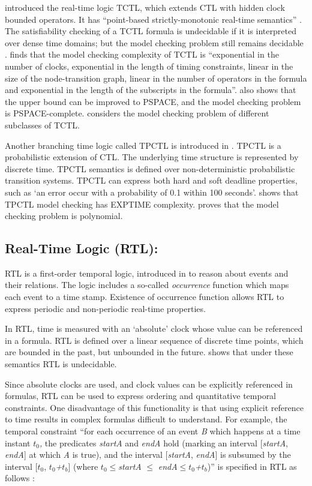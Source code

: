 \documentclass[11pt]{article}
\begin{document}
\cite{ACD90} introduced the real-time logic TCTL, which extends CTL with hidden clock bounded operators. It has ``point-based strictly-monotonic real-time semantics'' \cite{AHT92}.  The satisfiability checking of a TCTL formula is undecidable if it is interpreted over dense time domains; but the model checking problem still remains decidable \cite{ACD90}. \cite{ACD90} finds that the model checking complexity of TCTL is ``exponential in the number of clocks, exponential in the length of timing constraints, linear in the size of the node-transition graph, linear in the number of operators in the formula and exponential in the length of the subscripts in the formula''. \cite{ACD90} also shows that the upper bound can be improved to PSPACE, and the model checking problem is PSPACE-complete. \cite{LMS04} considers the model checking problem of different subclasses of TCTL. 

Another branching time logic called TPCTL is introduced in \cite{Han91}. TPCTL is a probabilistic extension of CTL. The underlying time structure is represented by discrete time. TPCTL semantics is defined over non-deterministic probabilistic transition systems. TPCTL can express both hard and soft deadline properties, such as
`an error occur with a probability of 0.1 within 100 seconds'.  \cite{Han91} shows that TPCTL model checking has EXPTIME complexity. \cite{BS98} proves that the model checking problem is polynomial.

\subsection{Real-Time Logic (RTL)\label{sub:Real-Time-Logic-(RTL):}: }

RTL is a first-order temporal logic, introduced in \cite{JM86} to reason about events and their relations. The logic includes a so-called \emph{occurrence} function which maps each event to a time stamp. Existence of occurrence function allows RTL to express periodic and non-periodic real-time properties.

In RTL, time is measured with an `absolute' clock whose value can be referenced in a formula.  RTL is defined over a linear sequence of discrete time points, which are bounded in the past, but unbounded in the future. \cite{AH90} shows that under these semantics RTL is undecidable. 

Since absolute clocks are used, and clock values can be explicitly referenced in formulas, RTL can be used to express ordering and quantitative temporal constraints.  One disadvantage of this functionality is that using explicit reference to time results in complex formulas difficult to understand.  For example, the temporal constraint ``for each occurrence of an event \emph{B} which happens at a time instant \emph{$t_{0}$,} the predicates \emph{startA} and \emph{endA} hold (marking an interval {[}\emph{startA}, \emph{endA}] at which \emph{A} is true), and the interval {[}\emph{startA}, \emph{endA}] is subsumed by the interval {[}\emph{$t_{0}$}, \emph{$t_{0}$+$t_{b}$}] (where \emph{$t_{0}$}$\leq$\emph{startA} $\leq$ \emph{endA}$\leq$\emph{$t_{0}$+$t_{b}$})''  is specified in RTL as follows \cite{BMN00}:
\end{document}
